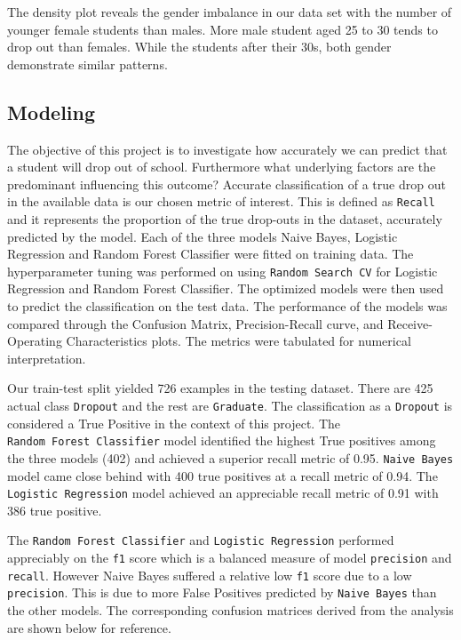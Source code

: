 \documentclass[
]{article}
\begin{document}
The density plot reveals the gender imbalance in our data set with the
number of younger female students than males. More male student aged 25
to 30 tends to drop out than females. While the students after their
30s, both gender demonstrate similar patterns.

\hypertarget{modeling-1}{%
\subsection{Modeling}\label{modeling-1}}

The objective of this project is to investigate how accurately we can
predict that a student will drop out of school. Furthermore what
underlying factors are the predominant influencing this outcome?
Accurate classification of a true drop out in the available data is our
chosen metric of interest. This is defined as \texttt{Recall} and it
represents the proportion of the true drop-outs in the dataset,
accurately predicted by the model. Each of the three models Naive Bayes,
Logistic Regression and Random Forest Classifier were fitted on training
data. The hyperparameter tuning was performed on using
\texttt{Random\ Search\ CV} for Logistic Regression and Random Forest
Classifier. The optimized models were then used to predict the
classification on the test data. The performance of the models was
compared through the Confusion Matrix, Precision-Recall curve, and
Receive-Operating Characteristics plots. The metrics were tabulated for
numerical interpretation.

Our train-test split yielded 726 examples in the testing dataset. There
are 425 actual class \texttt{Dropout} and the rest are
\texttt{Graduate}. The classification as a \texttt{Dropout} is
considered a True Positive in the context of this project. The
\texttt{Random\ Forest\ Classifier} model identified the highest True
positives among the three models (402) and achieved a superior recall
metric of 0.95. \texttt{Naive\ Bayes} model came close behind with 400
true positives at a recall metric of 0.94. The
\texttt{Logistic\ Regression} model achieved an appreciable recall
metric of 0.91 with 386 true positive.

The \texttt{Random\ Forest\ Classifier} and
\texttt{Logistic\ Regression} performed appreciably on the \texttt{f1}
score which is a balanced measure of model \texttt{precision} and
\texttt{recall}. However Naive Bayes suffered a relative low \texttt{f1}
score due to a low \texttt{precision}. This is due to more False
Positives predicted by \texttt{Naive\ Bayes} than the other models. The
corresponding confusion matrices derived from the analysis are shown
below for reference.
\end{document}
